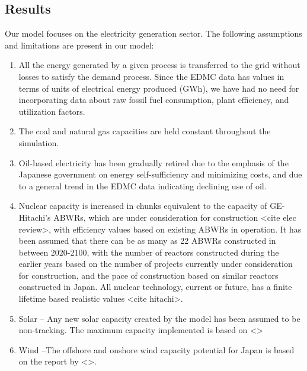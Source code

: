 \documentclass[14pt,a4paper]{article} %
\begin{document}
\begin{enumerate}
\end{enumerate}

\subsection{Results}

	Our model focuses on the electricity generation sector. The following assumptions and limitations are present in our model:
	
\begin{enumerate}

\item All the energy generated by a given process is transferred to the grid without losses to satisfy the demand process. Since the EDMC data has values in terms of units of electrical energy produced (GWh), we have had no need for incorporating data about raw fossil fuel consumption, plant efficiency, and utilization factors.

\item The coal and natural gas capacities are held constant throughout the simulation.

\item Oil-based electricity has been gradually retired due to the emphasis of the Japanese government on energy self-sufficiency and minimizing costs, and due to a general trend in the EDMC data indicating declining use of oil.

\item Nuclear capacity is increased in chunks equivalent to the capacity of GE-Hitachi’s ABWRs, which are under consideration for construction <cite elec review>, with efficiency values based on existing ABWRs in operation. It has been assumed that there can be as many as 22 ABWRs constructed in between 2020-2100, with the number of reactors constructed during the earlier years based on the number of projects currently under consideration for construction, and the pace of construction based on similar reactors constructed in Japan. All nuclear technology, current or future, has a finite lifetime based realistic values <cite hitachi>.

\item Solar – Any new solar capacity created by the model has been assumed to be non-tracking. The maximum capacity implemented is based on <>

\item Wind –The offshore and onshore wind capacity potential for Japan is based on the report by <>.


\end{enumerate}
\end{document}
